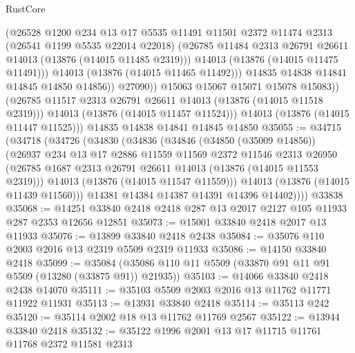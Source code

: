 \begin{lexlean}{RustCore}
\begin{coremodule}
                      (@26528
                        @1200
                        @234
                        @13
                        @17
                        @5535
                        @11491
                        @11501
                        @2372
                        @11474
                        @2313
                        (@26541 @1199 @5535 @22014 @22018)
                        (@26785 @11484 @2313 @26791 @26611 @14013 (@13876 (@14015 @11485 @2319)))
                        @14013
                        (@13876 (@14015 @11475 @11491)))
                      @14013
                      (@13876 (@14015 @11465 @11492)))
                    @14835
                    @14838
                    @14841
                    @14845
                    @14850
                    @14856))
                @27090))
            @15063
            @15067
            @15071
            @15078
            @15083))
        (@26785 @11517 @2313 @26791 @26611 @14013 (@13876 (@14015 @11518 @2319)))
        @14013
        (@13876 (@14015 @11457 @11524)))
      @14013
      (@13876 (@14015 @11447 @11525)))
    @14835
    @14838
    @14841
    @14845
    @14850
@35055 := @34715
    (@34718
      (@34726
        (@34830
          (@34836
            (@34846
              (@34850 (@35009 @14856))
              (@26937
                @234
                @13
                @17
                @2886
                @11559
                @11569
                @2372
                @11546
                @2313
                @26950
                (@26785 @1687 @2313 @26791 @26611 @14013 (@13876 (@14015 @11553 @2319)))
                @14013
                (@13876 (@14015 @11547 @11559)))
              @14013
              (@13876 (@14015 @11439 @11560)))
            @14381
            @14384
            @14387
            @14391
            @14396
            @14402))))
    @33838
@35068 := @14251 @33840 @2418 @2418 @287 @13 @2017 @2127 @105 @11933 @287 @2353 @12656 @12851
@35073 := @15001 @33840 @2418 @2017 @13 @11933
@35076 := @13899 @33840 @2418 @2438
@35084 := @35076 @110 @2003 @2016 @13 @2319 @5509 @2319 @11933
@35086 := @14150 @33840 @2418
@35099 := @35084 (@35086 @110 @11 @5509 (@33870 @91 @11 @91 @5509 (@13280 (@33875 @91)) @21935))
@35103 := @14066 @33840 @2418 @2438 @14070
@35111 := @35103 @5509 @2003 @2016 @13 @11762 @11771 @11922 @11931
@35113 := @13931 @33840 @2418
@35114 := @35113 @242
@35120 := @35114 @2002 @18 @13 @11762 @11769 @2567
@35122 := @13944 @33840 @2418
@35132 := @35122 @1996 @2001 @13 @17 @11715 @11761 @11768 @2372 @11581 @2313

\end{coremodule}
\end{lexlean}
